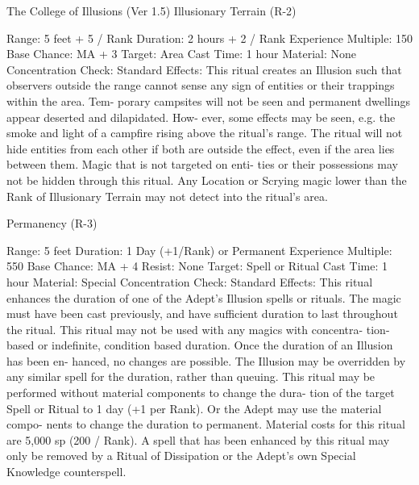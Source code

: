 \begin{Chapter}{The College of Illusions (Ver 1.5)}
Illusionary Terrain (R-2) 

Range: 5 feet + 5 / Rank 
Duration: 2 hours + 2 / Rank 
Experience Multiple: 150 
Base Chance: MA + 3%
Target: Area 
Cast Time: 1 hour 
Material: None 
Concentration Check: Standard 
Effects:  This  ritual  creates  an  Illusion  such  that 
observers  outside  the  range  cannot  sense  any  sign 
of  entities  or  their trappings  within  the  area.  Tem-
porary  campsites  will  not  be  seen  and  permanent 
dwellings  appear  deserted  and  dilapidated.  How-
ever, some effects may be seen, e.g. the smoke and 
light  of  a  campfire  rising  above  the  ritual’s  range. 
The  ritual  will  not  hide  entities  from each  other  if 
both  are  outside  the  effect,  even  if  the  area  lies 
between  them.  Magic  that  is  not  targeted  on  enti-
ties or their possessions may not be hidden through 
this  ritual.  Any  Location  or  Scrying  magic  lower 
than the Rank of Illusionary Terrain may not detect 
into the ritual’s area. 

Permanency (R-3) 

Range: 5 feet 
Duration: 1 Day (+1/Rank) or Permanent 
Experience Multiple: 550 
Base Chance: MA + 4%
Resist: None 
Target: Spell or Ritual 
Cast Time: 1 hour 
Material: Special 
Concentration Check: Standard 
Effects: This ritual enhances the duration of one of 
the  Adept’s  Illusion  spells  or  rituals.  The  magic 
must have been cast previously, and have sufficient 
duration  to  last  throughout  the  ritual.  This  ritual 
may  not  be  used  with  any  magics  with  concentra-
tion-based  or  indefinite,  condition  based  duration. 
Once  the  duration  of  an  Illusion  has  been  en-
hanced, no changes are possible. The  Illusion may 
be overridden by any similar spell for the duration, 
rather  than  queuing.  This  ritual  may  be  performed 
without  material  components  to  change  the  dura-
tion  of  the  target  Spell  or  Ritual  to  1  day  (+1  per 
Rank). Or the Adept may use the material compo-
nents to change the duration to permanent. Material 
costs  for  this  ritual  are  5,000  sp  (200  /  Rank).  A 
spell  that  has  been  enhanced  by  this  ritual  may 
only  be  removed  by  a  Ritual  of  Dissipation  or  the 
Adept’s own Special Knowledge counterspell. 

\end{Chapter}
